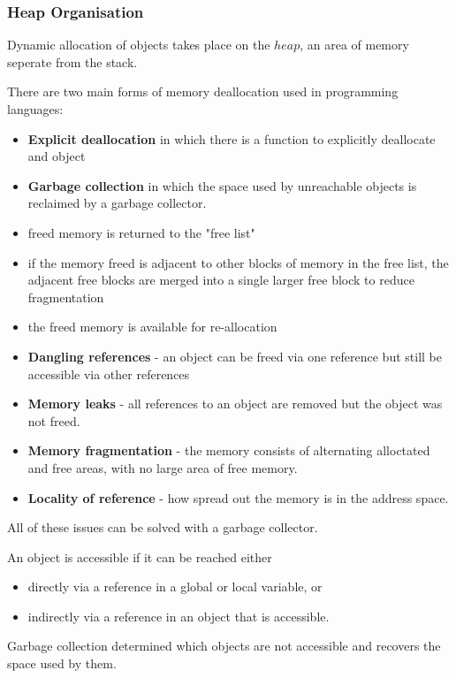 \subsubsection{Heap Organisation}
Dynamic allocation of objects takes place on the $heap$, an area of memory seperate 
from the stack.

There are two main forms of memory deallocation used in programming languages:
\begin{itemize}
    \item \textbf{Explicit deallocation} in which there is a function to explicitly 
    deallocate and object
    \item \textbf{Garbage collection} in which the space used by unreachable objects 
    is reclaimed by a garbage collector.
\end{itemize}

\begin{itemize}
    \item freed memory is returned to the "free list"
    \item if the memory freed is adjacent to other blocks of memory in the free list, 
    the adjacent free blocks are merged into a single larger free block to reduce 
    fragmentation
    \item the freed memory is available for re-allocation
\end{itemize}

\begin{itemize}
    \item \textbf{Dangling references} - an object can be freed via one reference but 
    still be accessible via other references
    \item \textbf{Memory leaks} - all references to an object are removed but the object 
    was not freed.
    \item \textbf{Memory fragmentation} - the memory consists of alternating alloctated 
    and free areas, with no large area of free memory.
    \item \textbf{Locality of reference} - how spread out the memory is in the address space.
\end{itemize}
All of these issues can be solved with a garbage collector.

An object is accessible if it can be reached either
\begin{itemize}
    \item directly via a reference in a global or local variable, or
    \item indirectly via a reference in an object that is accessible.
\end{itemize}
Garbage collection determined which objects are not accessible and recovers the space used 
by them.

